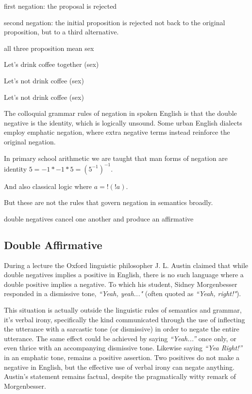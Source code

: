 first negation: the proposal is rejected

second negation: the initial proposition is rejected not back to the original proposition, but to a third alternative.

all three proposition mean sex

Let's drink coffee together (sex)

Let's not drink coffee (sex)

Let's not drink coffee (sex)

The colloquial grammar rules of negation in spoken English is that the double negative is the identity, which is logically unsound. Some urban English dialects employ emphatic negation, where extra negative terms instead reinforce the original negation.

In primary school arithmetic we are taught that man forms of negation are identity $5 = -1 * -1 * 5 = (5^{-1})^{-1}$. 

And also classical logic where $a = !(!a)$.

But these are not the rules that govern negation in semantics broadly.

double negatives cancel one another and produce an affirmative

\subsection{Double Affirmative}

During a lecture the Oxford linguistic philosopher J. L. Austin claimed that while double negatives implies a positive in English, there is no such language where a double positive implies a negative. To which his student, Sidney Morgenbesser responded in a dismissive tone, \textit{``Yeah, yeah..."} (often quoted as \textit{``Yeah, right!"}).

This situation is actually outside the linguistic rules of semantics and grammar, it's verbal irony, specifically the kind communicated through the use of inflecting the utterance with a sarcastic tone (or dismissive) in order to negate the entire utterance. The same effect could be achieved by saying \textit{``Yeah...''} once only, or even thrice with an accompanying dismissive tone. Likewise saying \textit{``Yea Right!''} in an emphatic tone, remains a positive assertion. Two positives do not make a negative in English, but the effective use of verbal irony can negate anything. Austin's statement remains factual, despite the pragmatically witty remark of Morgenbesser. 

